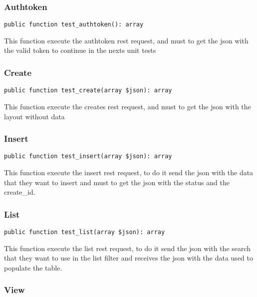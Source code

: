 \documentclass[a4paper]{article}
\begin{document}
\hypertarget{toc429}{}
\subsubsection{Authtoken}

\begin{lstlisting}
public function test_authtoken(): array
\end{lstlisting}

This function execute the authtoken rest request, and must to get the
json with the valid token to continue in the nexts unit tests

\hypertarget{toc430}{}
\subsubsection{Create}

\begin{lstlisting}
public function test_create(array $json): array
\end{lstlisting}

This function execute the creates rest request, and must to get the
json with the layout without data

\hypertarget{toc431}{}
\subsubsection{Insert}

\begin{lstlisting}
public function test_insert(array $json): array
\end{lstlisting}

This function execute the insert rest request, to do it send the json with
the data that they want to insert and must to get the json with the status
and the create\_id.

\hypertarget{toc432}{}
\subsubsection{List}

\begin{lstlisting}
public function test_list(array $json): array
\end{lstlisting}

This function execute the list rest request, to do it send the json with
the search that they want to use in the list filter and receives the json
with the data used to populate the table.

\hypertarget{toc433}{}
\subsubsection{View}
\end{document}
